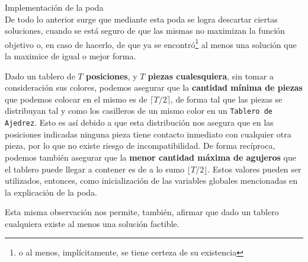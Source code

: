 \documentclass[11pt, a4paper, twoside]{article}
\begin{document}
\begin{paragraph}{Implementación de la poda\\}
De todo lo anterior surge que mediante esta poda se logra descartar ciertas
soluciones, cuando se está seguro de que las mismas no maximizan la función
objetivo o, en caso de hacerlo, de que ya se encontró\footnote{o al menos,
implícitamente, se tiene certeza de su existencia} al menos una solución que
la maximice de igual o mejor forma.

\begin{corolario}

Dado un tablero de \textbf{$T$ posiciones}, y \textbf{$T$ piezas cualesquiera},
sin tomar a consideración sus colores, podemos asegurar que la \textbf{cantidad
mínima de piezas} que podemos colocar en el mismo es de $\lceil{T/2}\rceil$, de
forma tal que las piezas se distribuyan tal y como los casilleros de un mismo
color en un \texttt{Tablero de Ajedrez}. Esto es así debido a que esta
distribución nos asegura que en las posiciones indicadas ninguna pieza tiene
contacto inmediato con cualquier otra pieza, por lo que no existe riesgo de
incompatibilidad. De forma recíproca, podemos también asegurar que la
\textbf{menor cantidad máxima de agujeros} que el tablero puede llegar a
contener es de a lo sumo $\lfloor{T/2}\rfloor$. Estos valores pueden ser
utilizados, entonces, como inicialización de las variables globales mencionadas
en la explicación de la poda.

Esta misma observación nos permite, también, afirmar que dado un tablero
cualquiera existe al menos una solución factible.

\end{corolario}

\end{paragraph}
\end{document}
